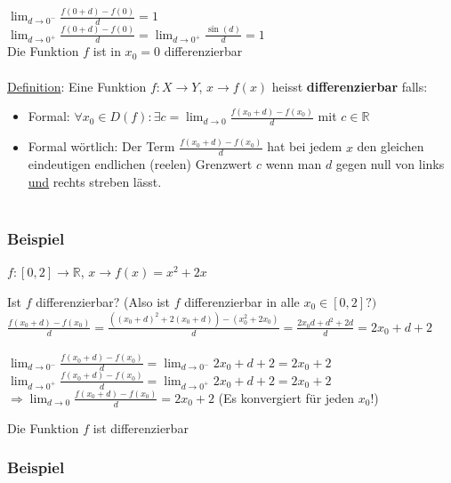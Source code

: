\documentclass[11pt]{article} %
\begin{document}
$\lim_{d \rightarrow 0^-} \frac{f(0+d)-f(0)}{d} = 1$\\
$\lim_{d \rightarrow 0^+} \frac{f(0+d)-f(0)}{d} = \lim_{d \rightarrow 0^+} \frac{\sin(d)}{d} =1$\\

Die Funktion $f$ ist in $x_0=0$ differenzierbar\\\\


\underline{Definition}: Eine Funktion $f: X \rightarrow Y$, $x \rightarrow f(x)$ heisst {\bf differenzierbar} falls:
\begin{itemize}  
\item Formal: $\forall x_0 \in D(f): \exists c = \lim_{d \rightarrow 0} \frac{f(x_0+d)-f(x_0)}{d}$ mit $c\in \mathbb{R}$
\item Formal wörtlich: Der Term $\frac{f(x_0+d)-f(x_0)}{d}$ hat bei jedem $x$ den gleichen eindeutigen endlichen (reelen) Grenzwert $c$ wenn man $d$ gegen null von links \underline{und} rechts streben lässt.\\\\
\end{itemize}

\subsubsection{Beispiel}

$f: [0,2] \rightarrow \mathbb{R}$, $x \rightarrow f(x) = x^2 + 2x $

Ist $f$ differenzierbar? (Also ist $f$ differenzierbar in alle $x_0 \in [0,2]?)$\\

$ \frac{f(x_0+d)-f(x_0)}{d} = \frac{((x_0+d)^2+2(x_0+d))-(x_0^2 + 2x_0)}{d}=\frac{2x_0d+d^2+2d}{d}= 2x_0 +d + 2 $\\\\
$ \lim_{d \rightarrow 0^-} \frac{f(x_0+d)-f(x_0)}{d} =  \lim_{d \rightarrow 0^-} 2x_0 + d + 2 = 2x_0 + 2 $\\
$ \lim_{d \rightarrow 0^+} \frac{f(x_0+d)-f(x_0)}{d} =  \lim_{d \rightarrow 0^+} 2x_0 + d + 2 = 2x_0 + 2 $\\
$\Rightarrow \lim_{d \rightarrow 0} \frac{f(x_0+d)-f(x_0)}{d} =2x_0 + 2 $ (Es konvergiert für jeden $x_0$!)

Die Funktion $f$ ist differenzierbar

\subsubsection{Beispiel}
\end{document}
